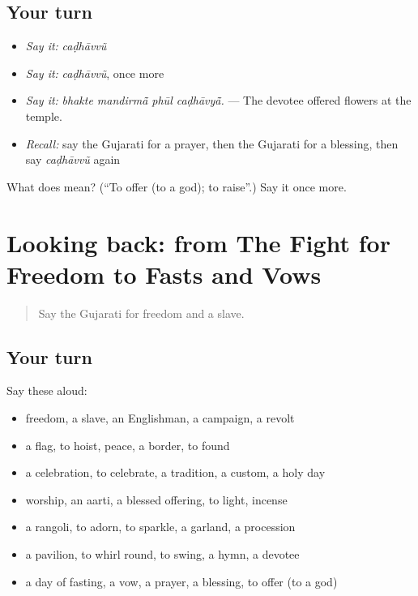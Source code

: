 \subsection*{Your turn}
\begin{itemize}
\raggedright
  \item \emph{Say it:} \emph{caḍhāvvũ}
  \item \emph{Say it:} \emph{caḍhāvvũ}, once more
  \item \emph{Say it:} \emph{bhakte mandirmā̃ phūl caḍhāvyā̃.} — The devotee offered flowers at the temple.
  \item \emph{Recall:} say the Gujarati for a prayer, then the Gujarati for a blessing, then say \emph{caḍhāvvũ} again
\end{itemize}

\begin{tcolorbox}[breakable,colback=teal!4,colframe=teal!35!black,title={Before you move on}]
What does  mean? (\textquotedblleft{}To offer (to a god); to raise\textquotedblright{}.) Say it once more.
\end{tcolorbox}
\section[(dialogue)]{Looking back: from The Fight for Freedom to Fasts and Vows}

\label{lesson:GU-R331-review-325-331}



\begin{quote}
Say the Gujarati for freedom and a slave.
\end{quote}

\subsection*{Your turn}
Say these aloud:

\begin{itemize}
\raggedright
  \item freedom, a slave, an Englishman, a campaign, a revolt
  \item a flag, to hoist, peace, a border, to found
  \item a celebration, to celebrate, a tradition, a custom, a holy day
  \item worship, an aarti, a blessed offering, to light, incense
  \item a rangoli, to adorn, to sparkle, a garland, a procession
  \item a pavilion, to whirl round, to swing, a hymn, a devotee
  \item a day of fasting, a vow, a prayer, a blessing, to offer (to a god)
\end{itemize}


